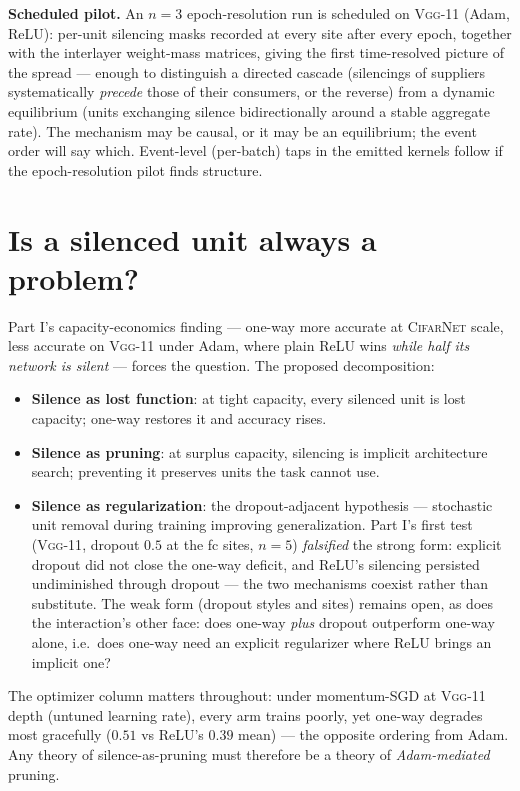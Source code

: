 \documentclass[11pt]{article}
\newcommand{\modelCifarNet}{\textsc{CifarNet}\xspace}
\newcommand{\modelVggEleven}{\textsc{Vgg-11}\xspace}
\begin{document}
\textbf{Scheduled pilot.} An $n{=}3$ epoch-resolution run is
scheduled on \modelVggEleven{} (Adam, ReLU): per-unit silencing
masks recorded at every site after every epoch, together with the
interlayer weight-mass matrices, giving the first time-resolved
picture of the spread --- enough to distinguish a directed cascade
(silencings of suppliers systematically \emph{precede} those of
their consumers, or the reverse) from a dynamic equilibrium (units
exchanging silence bidirectionally around a stable aggregate rate).
The mechanism may be causal, or it may be an equilibrium; the event
order will say which. Event-level (per-batch) taps in the emitted
kernels follow if the epoch-resolution pilot finds structure.

\section{Is a silenced unit always a problem?}
\label{sec:pathology}

Part I's capacity-economics finding --- one-way more accurate at
\modelCifarNet{} scale, less accurate on \modelVggEleven{} under
Adam, where plain ReLU wins \emph{while half its network is silent}
--- forces the question. The proposed decomposition:

\begin{itemize}
\item \textbf{Silence as lost function}: at tight capacity, every
silenced unit is lost capacity; one-way restores it and accuracy
rises.
\item \textbf{Silence as pruning}: at surplus capacity, silencing is
implicit architecture search; preventing it preserves units the task
cannot use.
\item \textbf{Silence as regularization}: the dropout-adjacent
hypothesis --- stochastic unit removal during training improving
generalization. Part I's first test (\modelVggEleven{}, dropout
$0.5$ at the fc sites, $n{=}5$) \emph{falsified} the strong form:
explicit dropout did not close the one-way deficit, and ReLU's
silencing persisted undiminished through dropout --- the two
mechanisms coexist rather than substitute. The weak form (dropout
styles and sites) remains open, as does the interaction's other
face: does one-way \emph{plus} dropout outperform one-way alone,
i.e.\ does one-way need an explicit regularizer where ReLU brings
an implicit one?
\end{itemize}

The optimizer column matters throughout: under momentum-SGD at
\modelVggEleven{} depth (untuned learning rate), every arm trains
poorly, yet one-way degrades most gracefully ($0.51$ vs ReLU's
$0.39$ mean) --- the opposite ordering from Adam. Any theory of
silence-as-pruning must therefore be a theory of
\emph{Adam-mediated} pruning.
\end{document}
